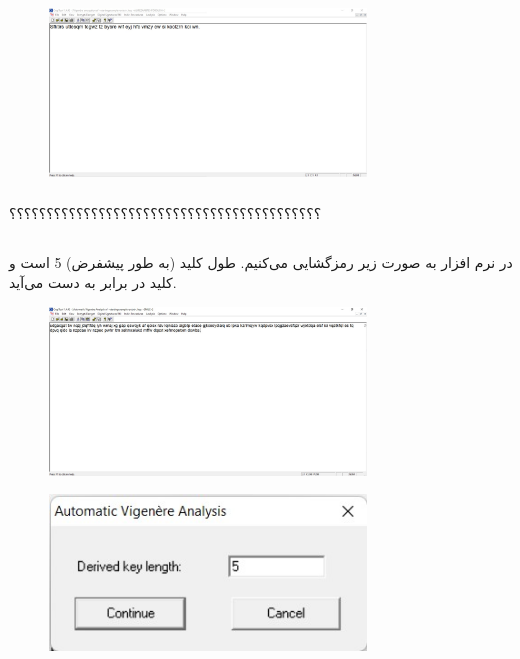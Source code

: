\documentclass{article}
\begin{document}
\begin{figure}[H]
    \centering
    \includegraphics[width=0.75\textwidth]{figures/3bc.jpg}
    \caption
	{}
    \label{fig:fig1}
\end{figure}

\subsubsection{}
؟؟؟؟؟؟؟؟؟؟؟؟؟؟؟؟؟؟؟؟؟؟؟؟؟؟؟؟؟؟؟؟؟؟؟؟؟؟؟؟؟؟




\subsection{}%
در نرم افزار  به صورت زیر رمزگشایی می‌کنیم. طول کلید (به طور پیشفرض) 5 است و کلید در  برابر  به دست می‌آید.
\begin{figure}[H]
    \centering
    \includegraphics[width=0.75\textwidth]{figures/4a.jpg}
    \caption
	{}
    \label{fig:fig1}
\end{figure}

\begin{figure}[H]
    \centering
    \includegraphics[width=0.75\textwidth]{figures/4b.jpg}
    \caption
	{}
    \label{fig:fig1}
\end{figure}
\end{document}
